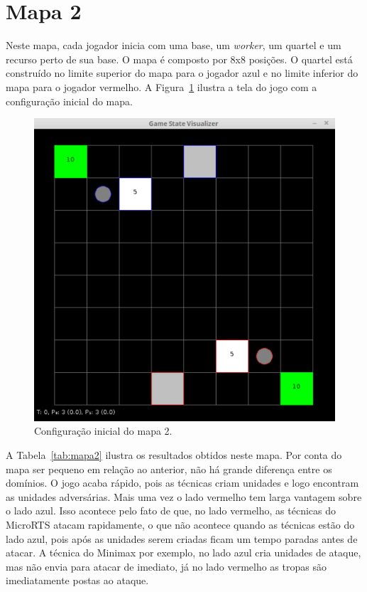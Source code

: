 \section{Mapa 2}

Neste mapa, cada jogador inicia com uma base, um \textit{worker}, um quartel e um recurso perto de sua base.
O mapa é composto por 8x8 posições.
O quartel está construído no limite superior do mapa para o jogador azul e no limite inferior do mapa para o jogador vermelho.
A Figura~\ref{fig:mapa8x8quartel} ilustra a tela do jogo com a configuração inicial do mapa.

\begin{figure}[ht]
	\centering
	\includegraphics[width=.5\textwidth]{fig/map8x8quartel.pdf}
	\caption{Configuração inicial do mapa 2.}
	\label{fig:mapa8x8quartel}
\end{figure}

A Tabela~\ref{tab:mapa2} ilustra os resultados obtidos neste mapa.
Por conta do mapa ser pequeno em relação ao anterior, não há grande diferença entre os domínios.
O jogo acaba rápido, pois as técnicas criam unidades e logo encontram as unidades adversárias.
Mais uma vez o lado vermelho tem larga vantagem sobre o lado azul. 
Isso acontece pelo fato de que, no lado vermelho, as técnicas do MicroRTS atacam rapidamente, o que não acontece quando as técnicas estão do lado azul, pois após as unidades serem criadas ficam um tempo paradas antes de atacar.
A técnica do Minimax por exemplo, no lado azul cria unidades de ataque, mas não envia para atacar de imediato, já no lado vermelho as tropas são imediatamente postas ao ataque.

